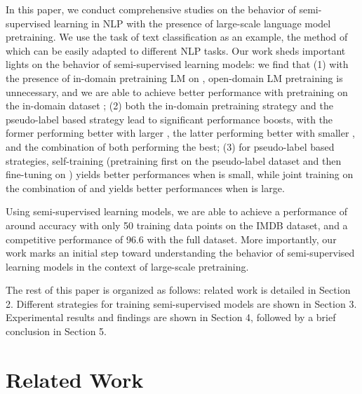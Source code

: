 \documentclass[11pt,a4paper]{article}
\begin{document}
In this paper, we conduct comprehensive studies on the behavior of semi-supervised learning in NLP 
with the presence of large-scale language model pretraining.  
We use the task of text classification as an example,  the method of which can be easily adapted to different NLP tasks.
Our work sheds important lights on the behavior of semi-supervised learning models: 
we find that
(1)  with the presence of  in-domain pretraining LM on , open-domain LM pretraining \cite{devlin2018bert} 
is unnecessary, and we
are able to achieve better performance with pretraining on  the in-domain dataset ;
 (2)
 both
the in-domain pretraining strategy and the pseudo-label based strategy
 lead to significant performance boosts,
with the former performing better with larger , the latter performing better with smaller , and the 
combination 
 of both performing the best;
(3) for pseudo-label based strategies, 
self-training (pretraining first on the pseudo-label dataset  and then fine-tuning on ) yields better performances when  is small, while joint training on the combination of 
 and  yields better performances when  is large.
 
Using semi-supervised learning models, we are able to achieve a performance of around  accuracy with only 50 training data points on the IMDB dataset, and 
 a competitive performance of 96.6 with the full dataset. 
More importantly, our work marks an initial step toward understanding the behavior of semi-supervised learning models in the context of large-scale pretraining. 


The rest of this paper is organized as follows: related work is detailed in Section 2. 
Different strategies for training semi-supervised models are shown in Section 3. 
Experimental results and findings are shown in Section 4, followed by a brief conclusion in Section 5. 

\section{Related Work}
\end{document}
